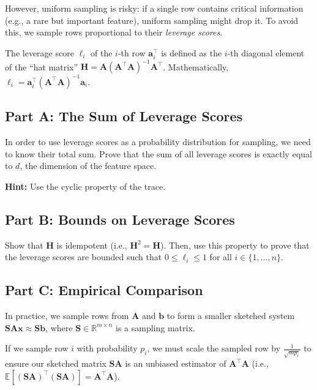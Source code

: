 \documentclass{article}
\begin{document}
However, uniform sampling is risky: if a single row contains critical information (e.g., a rare but important feature), uniform sampling might drop it. To avoid this, we sample rows proportional to their \emph{leverage scores}.

The leverage score \(\ell_i\) of the \(i\)-th row \(\mathbf{a}_i^\top\) is defined as the \(i\)-th diagonal element of the ``hat matrix'' \(\mathbf{H} = \mathbf{A}(\mathbf{A}^\top \mathbf{A})^{-1}\mathbf{A}^\top\). Mathematically, \(\ell_i = \mathbf{a}_i^\top (\mathbf{A}^\top \mathbf{A})^{-1} \mathbf{a}_i\).

\hypertarget{part-a-the-sum-of-leverage-scores}{%
\subsection*{Part A: The Sum of Leverage Scores}\label{part-a-the-sum-of-leverage-scores}}

In order to use leverage scores as a probability distribution for sampling, we need to know their total sum. Prove that the sum of all leverage scores is exactly equal to \(d\), the dimension of the feature space.

\textbf{Hint:} Use the cyclic property of the trace.

\hypertarget{part-b-bounds-on-leverage-scores}{%
\subsection*{Part B: Bounds on Leverage Scores}\label{part-b-bounds-on-leverage-scores}}

Show that \(\mathbf{H}\) is idempotent (i.e., \(\mathbf{H}^2 = \mathbf{H}\)). Then, use this property to prove that the leverage scores are bounded such that \(0 \leq \ell_i \leq 1\) for all \(i \in \{1, \dots, n\}\).

\hypertarget{part-c-empirical-comparison}{%
\subsection*{Part C: Empirical Comparison}\label{part-c-empirical-comparison}}

In practice, we sample rows from \(\mathbf{A}\) and \(\mathbf{b}\) to form a smaller sketched system \(\mathbf{S A x} \approx \mathbf{S b}\), where \(\mathbf{S} \in \mathbb{R}^{m \times n}\) is a sampling matrix.

If we sample row \(i\) with probability \(p_i\), we must scale the sampled row by \(\frac{1}{\sqrt{m p_i}}\) to ensure our sketched matrix \(\mathbf{S A}\) is an unbiased estimator of \(\mathbf{A}^\top \mathbf{A}\) (i.e., \(\mathbb{E}[(\mathbf{SA})^\top(\mathbf{SA})] = \mathbf{A}^\top \mathbf{A}\)).
\end{document}
